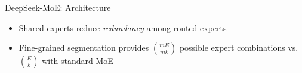 \begin{frame}{DeepSeek-MoE: Architecture}
\begin{center}
  \end{center}

  \vspace{0.2em}
  \begin{itemize}
    \item Shared experts reduce \emph{redundancy} among routed experts
    \item Fine-grained segmentation provides $\binom{mE}{mk}$ possible expert combinations vs.\ $\binom{E}{k}$ with standard MoE
  \end{itemize}
\end{frame}

